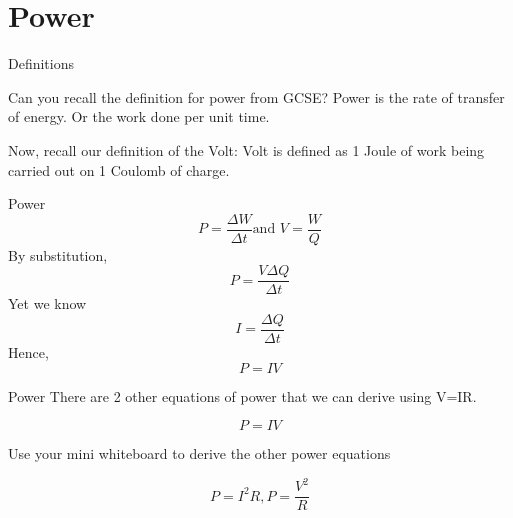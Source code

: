\documentclass[../Main.tex]{subfiles}
\begin{document}
\author{Power} %
\date{Year 1 Topic 14} %

\section{Power} %

\begin{frame}{Definitions}
    \begin{block}{Can you recall the definition for power from GCSE?}
        \pause 
        Power is the rate of transfer of energy. Or the work done per unit time. 
    \end{block}
    \pause
    \begin{block}{Now, recall our definition of the Volt:}
        Volt is defined as 1 Joule of work being carried out on 1 Coulomb of charge.
    \end{block}

\end{frame}

\begin{frame}{Power}
    \begin{equation*}
        P=\frac{\Delta W}{\Delta t} \mbox{and } V=\frac{W}{Q}
    \end{equation*}
    By substitution,
    \begin{equation*}
        P=\frac{V\Delta Q}{\Delta t}
    \end{equation*}
    Yet we know
    \begin{equation*}
        I=\frac{\Delta Q}{\Delta t}
    \end{equation*}
    Hence,
    \begin{equation*}
        P=IV
    \end{equation*}
\end{frame}

\begin{frame}{Power}
    There are 2 other equations of power that we can derive using V=IR.
    
    \begin{equation*}
        P=IV
    \end{equation*}
    
    \begin{exampleblock}{Use your mini whiteboard}
    to derive the other power equations
    \end{exampleblock}
    
    \pause
    
    {\huge
    \begin{equation*}
        P=I^2R, P=\frac{V^2}{R}
    \end{equation*}
    }
\end{frame}
\end{document}

